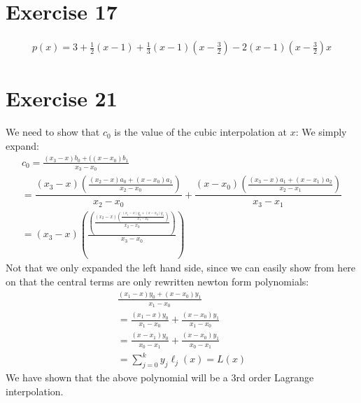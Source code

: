 \section{Exercise 17}
\begin{gather*}
p(x) = 3 + \frac{1}{2}(x-1) + \frac{1}{3}(x-1)(x-\frac{3}{2}) - 2(x-1)(x-\frac{3}{2}) x
\end{gather*}
\section{Exercise 21}
We need to show that $c_0$ is the value of the cubic interpolation at $x$:
We simply expand:
\begin{gather*}
c_0 = \frac{(x_3 - x)b_0 + ((x-x_0)b_1}{x_3 -x_0}\\
= \dfrac{(x_3 - x)\left( \frac{\left( x_2 -x \right) a_0 + \left( x -x_0 \right) a_1}{x_2 -x_0} \right)}{x_2 - x_0} + \dfrac{\left(x-x_0\right)\left( \frac{(x_3 -x)a_1 + (x-x_1) a_2}{x_2-x_1} \right) }{x_3-x_1}\\
= \left( x_3-x \right)\left(\frac{ \left( \frac{ (x_2 -x) \left( \frac{(x_1 - x)y_0 + (x-x_0)y_1}{x_1-x_0} \right)}{x_2-x_0} \right)}{x_3-x_0} \right)
\end{gather*}
Not that we only expanded the left hand side, since we can easily show from here on that the central terms are only rewritten newton form polynomials:
\begin{gather*}
\frac{(x_1 - x) y_0  + (x-x_0)y_1}{x_1-x_0}\\
= \frac{(x_1 - x) y_0}{x_1-x_0} + \frac{(x-x_0)y_1}{x_1 - x_0}\\
= \frac{(x -x_1) y_0}{x_0-x_1} + \frac{(x-x_0)y_1}{x_0-x_1}\\
= \sum_{j=0}^{k} y_j \ell_j(x) = L(x)
\end{gather*}
We have shown that the above polynomial will be a 3rd order Lagrange interpolation.
